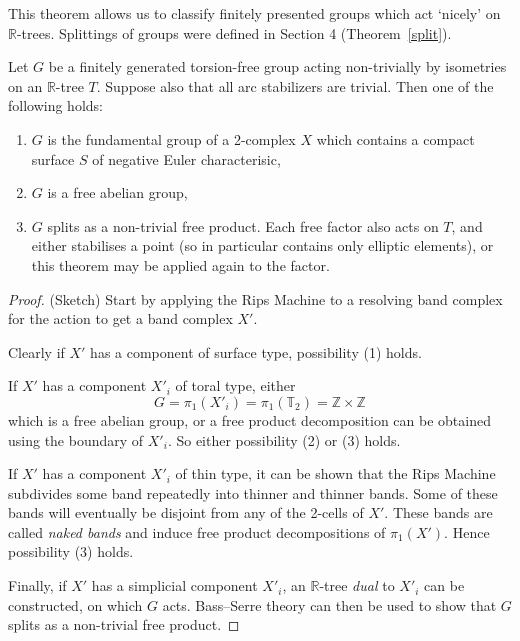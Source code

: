 This theorem allows us to classify finitely presented groups which act `nicely' on $\mathbb{R}$-trees. Splittings of groups were defined in Section 4 (Theorem~\ref{split}).
\begin{theorem}\label{rtreesclassification}
    Let $G$ be a finitely generated torsion-free group acting non-trivially by isometries on an $\mathbb{R}$-tree $T$. Suppose also that all arc stabilizers are trivial. Then one of the following holds:
    \begin{enumerate}
        \item $G$ is the fundamental group of a 2-complex $X$ which contains a compact surface $S$ of negative Euler characterisic,
        \item $G$ is a free abelian group,
        \item $G$ splits as a non-trivial free product. Each free factor also acts on $T$, and either stabilises a point (so in particular contains only elliptic elements), or this theorem may be applied again to the factor.
    \end{enumerate}
\end{theorem}
\begin{proof} (Sketch)
    Start by applying the Rips Machine to a resolving band complex for the action to get a band complex $X'$. 

    Clearly if $X'$ has a component of surface type, possibility (1) holds.

    If $X'$ has a component $X'_i$ of toral type, either \[G=\pi_1(X'_i)=\pi_1(\mathbb{T}_2)=\mathbb{Z}\times\mathbb{Z}\] which is a free abelian group, or a free product decomposition can be obtained using the boundary of $X'_i$. So either possibility (2) or (3) holds. 

    If $X'$ has a component $X'_i$ of thin type, it can be shown that the Rips Machine subdivides some band repeatedly into thinner and thinner bands. Some of these bands will eventually be disjoint from any of the 2-cells of $X'$. These bands are called \textit{naked bands} and induce free product decompositions of $\pi_1(X')$. %
    Hence possibility (3) holds.

    Finally, if $X'$ has a simplicial component $X'_i$, an $\mathbb{R}$-tree \textit{dual} to $X'_i$ can be constructed, on which $G$ acts. Bass--Serre theory can then be used to show that $G$ splits as a non-trivial free product.
\end{proof}

